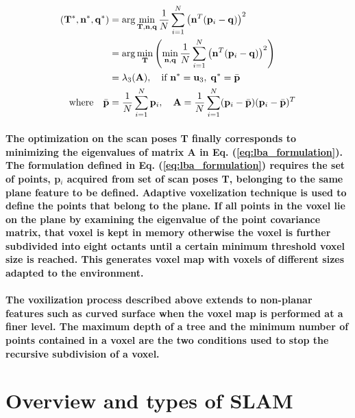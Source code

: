 \begin{align}
	(\mathbf{T}^*, \mathbf{n}^*, \mathbf{q}^*) 
	&= \arg \min_{\mathbf{T}, \mathbf{n}, \mathbf{q}} \frac{1}{N} \sum_{i=1}^{N} \left( \mathbf{n}^T (\mathbf{p}_i - \mathbf{q}) \right)^2 \notag \\
	&= \arg \min_{\mathbf{T}} \left( \min_{\mathbf{n}, \mathbf{q}} \frac{1}{N} \sum_{i=1}^{N} \left( \mathbf{n}^T (\mathbf{p}_i - \mathbf{q}) \right)^2 \right) \notag \\
	&= \lambda_3(\mathbf{A}), \quad \text{if } \mathbf{n}^* = \mathbf{u}_3, \; \mathbf{q}^* = \bar{\mathbf{p}}  \notag \\
	\text{where} \quad \bar{\mathbf{p}} &= \frac{1}{N} \sum_{i=1}^{N} \mathbf{p}_i, \quad 
	\mathbf{A} = \frac{1}{N} \sum_{i=1}^{N} (\mathbf{p}_i - \bar{\mathbf{p}})(\mathbf{p}_i - \bar{\mathbf{p}})^T 
	\label{eq:lba_formulation}
\end{align}
\paragraph{\textnormal{The optimization on the scan poses \textbf{T} finally corresponds to minimizing the eigenvalues of matrix \textbf{A} in Eq. (\ref{eq:lba_formulation}). The formulation defined in Eq. (\ref{eq:lba_formulation}) requires the set of points, \textbf{p}$_i$ acquired from set of scan poses \textbf{T}, belonging to the same plane feature to be defined. Adaptive voxelization technique \cite{liu2021balm} is used to define the points that belong to the plane. If all points in the voxel lie on the plane by examining the eigenvalue of the point covariance matrix, that voxel is kept in memory otherwise the voxel is further subdivided into eight octants until a certain minimum threshold voxel size is reached. This generates voxel map with voxels of different sizes adapted to the environment. }}

\paragraph{\textnormal{The voxilization process described above extends to non-planar features such as curved surface when the voxel map is performed at a finer level. The maximum depth of a tree and the minimum number of points contained in a voxel are the two conditions used to stop the recursive subdivision of a voxel.}}


\section{Overview and types of SLAM}
